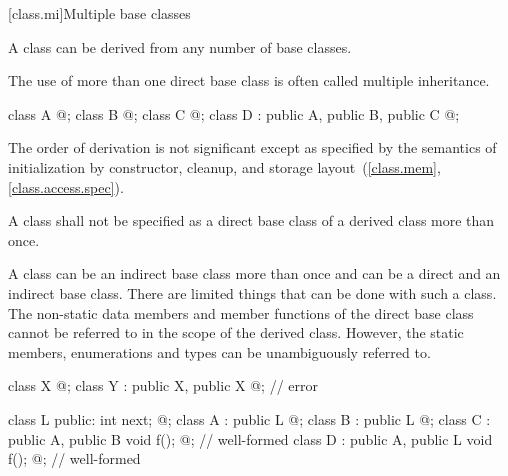 [class.mi]{Multiple base classes}
%
%

\pnum
A class can be derived from any number of base classes.
\begin{note}
The use of more than one direct base class is often called multiple inheritance.
\end{note}
\begin{example}
\begin{codeblock}
class A { @\commentellip@ };
class B { @\commentellip@ };
class C { @\commentellip@ };
class D : public A, public B, public C { @\commentellip@ };
\end{codeblock}
\end{example}

\pnum
{}%
%
\begin{note}
The order of derivation is not significant except as specified by the
semantics of initialization by constructor,
cleanup, and storage
layout~(\ref{class.mem}, \ref{class.access.spec}).
\end{note}

\pnum
A class shall not be specified as a direct base class of a derived class
more than once.
\begin{note}
A class can be an indirect base class more than once and can be a direct
and an indirect base class. There are limited things that can be done
with such a class. The non-static data members and member functions of
the direct base class cannot be referred to in the scope of the derived
class. However, the static members, enumerations and types can be
unambiguously referred to.
\end{note}
\begin{example}
\begin{codeblock}
class X { @\commentellip@ };
class Y : public X, public X { @\commentellip@ };             // error

\end{codeblock}
\begin{codeblock}
class L { public: int next;  @\commentellip@ };
class A : public L { @\commentellip@ };
class B : public L { @\commentellip@ };
class C : public A, public B { void f(); @\commentellip@ };   // well-formed
class D : public A, public L { void f(); @\commentellip@ };   // well-formed
\end{codeblock}
\end{example}

